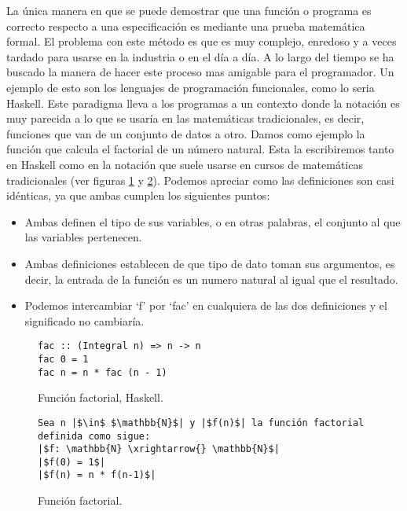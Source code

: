 La única manera en que se puede demostrar que una función o programa es correcto respecto a una 
especificación es mediante una prueba matemática formal. El problema con este método es que es muy 
complejo, enredoso y a veces tardado para usarse en la industria o en el día a día. A lo largo del 
tiempo se ha buscado la manera de hacer este proceso mas amigable para el programador. Un ejemplo de 
esto son los lenguajes de programación funcionales, como lo seria Haskell. Este paradigma lleva a 
los programas a un contexto donde la notaci\'on es muy parecida a lo que se usar\'ia en las 
matemáticas tradicionales, es decir, funciones que van de un conjunto de datos a otro. Damos como ejemplo la 
funci\'on que calcula el factorial de un n\'umero natural. Esta la escribiremos tanto en Haskell 
como en la notaci\'on que suele usarse en cursos de matemáticas tradicionales (ver figuras 
\ref{func_fact_hask} y \ref{func_fact_math}). 
Podemos apreciar como las definiciones son casi idénticas, ya que ambas cumplen los siguientes 
puntos:
\begin{itemize}
    \item Ambas definen el tipo de sus variables, o en otras palabras, el conjunto al que las 
    variables pertenecen.
    \item Ambas definiciones establecen de que tipo de dato toman sus argumentos, es decir, la 
    entrada de la funci\'on es un numero natural al igual que el resultado.
    \item Podemos intercambiar `f' por `fac' en cualquiera de las dos definiciones y el significado 
    no cambiaría.
\end{itemize}
\begin{figure}[!ht]
\centering
\captionsetup{justification=centering}
\begin{verbatim}
fac :: (Integral n) => n -> n
fac 0 = 1
fac n = n * fac (n - 1)
\end{verbatim}
\caption{Funci\'on factorial, Haskell.}
\label{func_fact_hask}
\end{figure}

\begin{figure}[!ht]
\centering
\captionsetup{justification=centering}
\begin{verbatim}
Sea n |$\in$ $\mathbb{N}$| y |$f(n)$| la función factorial definida como sigue:
|$f: \mathbb{N} \xrightarrow{} \mathbb{N}$|
|$f(0) = 1$|
|$f(n) = n * f(n-1)$|
\end{verbatim}
\caption{Funci\'on factorial.}
\label{func_fact_math}
\end{figure}

